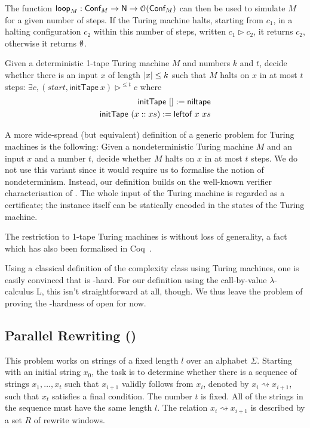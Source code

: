 \documentclass[a4paper,UKenglish,cleveref, autoref]{lipics-v2019}
\newcommand{\strent}{\rightsquigarrow}
\begin{document}
The function $\textsf{loop}_M : \textsf{Conf}_M \rightarrow \mathsf{N} \rightarrow \mathcal{O}{(\textsf{Conf}_M)}$ can then be used to simulate $M$ for a given number of steps. If the Turing machine halts, starting from $c_1$, in a halting configuration $c_2$ within this number of steps, written $c_1 \rhd c_2$, it returns $c_2$, otherwise it returns $\emptyset$.


\begin{definition}[\gennp{}]
  Given a deterministic 1-tape Turing machine $M$ and numbers $k$ and $t$, decide whether there is an input $x$ of length $|x| \le k$ such that $M$ halts on $x$ in at most $t$ steps: 
  $\exists c, (\mathit{start}, \textsf{initTape}~x) \rhd^{\le t} c$
  where 
  \begin{align*}
    \textsf{initTape}~[] := \textsf{niltape}\\
    \textsf{initTape}~(x :: xs) := \textsf{leftof}~x~xs
  \end{align*}
\end{definition}

A more wide-spread (but equivalent) definition of a generic problem for Turing machines is the following: Given a nondeterministic Turing machine $M$ and an input $x$ and a number $t$, decide whether $M$ halts on $x$ in at most $t$ steps. 
We do not use this variant since it would require us to formalise the notion of nondeterminism. Instead, our definition builds on the well-known verifier characterisation of \NP{}. The whole input of the Turing machine is regarded as a certificate; the instance itself can be statically encoded in the states of the Turing machine.

The restriction to 1-tape Turing machines is without loss of generality, a fact which has also been formalised in Coq~\cite{ForsterEtAl:2019:VerifiedTMs}. 

Using a classical definition of the complexity class \NP{} using Turing machines, one is easily convinced that \gennp{} is \NP{}-hard. For our definition using the call-by-value $\lambda$-calculus L, this isn't straightforward at all, though. We thus leave the problem of proving the \NP{}-hardness of \gennp{} open for now.

\subsection{Parallel Rewriting (\strconrew{})}
This problem works on strings of a fixed length $l$ over an alphabet $\Sigma$. Starting with an initial string $x_0$, the task is to determine whether there is a sequence of strings $x_1, \ldots, x_t$ such that $x_{i+1}$ validly follows from $x_i$, denoted by $x_i \strent x_{i+1}$, such that $x_t$ satisfies a final condition. The number $t$ is fixed. All of the strings in the sequence must have the same length $l$. The relation $x_i \strent x_{i+1}$ is described by a set $R$ of rewrite windows.
\end{document}
